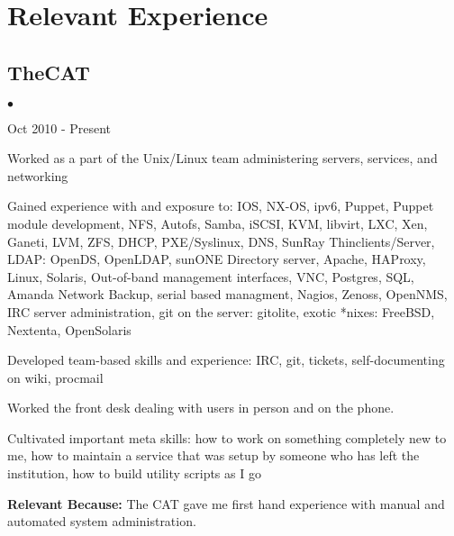 \documentclass[10pt,letterpaper]{article}
\renewenvironment{itemize}{
  \begin{list}{}{
    \setlength{\leftmargin}{1.5em}
    \setlength{\itemsep}{0.25em}
    \setlength{\parskip}{0pt}
    \setlength{\parsep}{0.25em}
  }
}{
  \end{list}
}
\begin{document}
\renewenvironment{itemize}{
  \begin{list}{$\bullet$}{
    \setlength{\leftmargin}{1.5em}
    \setlength{\itemsep}{0.25em}
    \setlength{\parskip}{0pt}
    \setlength{\parsep}{0.25em}
  }
}{
  \end{list}
}
\section*{Relevant Experience}

\subsection*{TheCAT}
\begin{itemize}

    \item Oct 2010 - Present
    \item Worked as a part of the Unix/Linux team administering servers, services, and networking
    \item Gained experience with and exposure to: IOS, NX-OS, ipv6, Puppet, Puppet module development, NFS, Autofs, Samba, iSCSI, KVM, libvirt, LXC, Xen, Ganeti, LVM, ZFS, DHCP, PXE/Syslinux, DNS, SunRay Thinclients/Server, LDAP: OpenDS, OpenLDAP, sunONE Directory server, Apache, HAProxy, Linux, Solaris, Out-of-band management interfaces, VNC, Postgres, SQL, Amanda Network Backup, serial based managment, Nagios, Zenoss, OpenNMS, IRC server administration, git on the server: gitolite, exotic *nixes: FreeBSD, Nextenta, OpenSolaris
    \item Developed team-based skills and experience: IRC, git, tickets, self-documenting on wiki, procmail
    \item Worked the front desk dealing with users in person and on the phone.
    \item Cultivated important meta skills: how to work on something completely new to me, how to maintain a service that was setup by someone who has left the institution, how to build utility scripts as I go

    \item \textbf{Relevant Because:} The CAT gave me first hand experience with manual and automated system administration.
 
\end{itemize}
\end{document}
